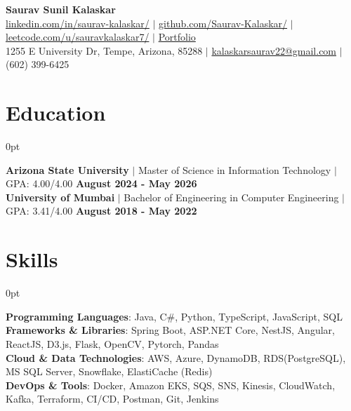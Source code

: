 \documentclass[letterpaper,10pt]{article}
\newlength{\contentindent}
\newcommand{\sectioncontent}[1]{%
  \begin{adjustwidth}{\contentindent}{0pt}%
  #1%
  \end{adjustwidth}%
}
\begin{document}
\setlength{\parindent}{0pt}
\setlength{\parskip}{0pt}
\setlength{\rightskip}{0.25em}

\begin{center}
    {\Huge \textbf{Saurav Sunil Kalaskar}}\\[2pt]
    
    \href{http://www.linkedin.com/in/saurav-kalaskar}{linkedin.com/in/saurav-kalaskar/} $|$
    \href{https://github.com/Saurav-Kalaskar}{github.com/Saurav-Kalaskar/} $|$
    \href{https://leetcode.com/u/sauravkalaskar7/}{leetcode.com/u/sauravkalaskar7/} $|$
    \href{https://www.saurav-kalaskar.me/}{Portfolio}
    \\
    1255 E University Dr, Tempe, Arizona, 85288 $|$ \href{mailto:sauravkalaskar7@gmail.com}{kalaskarsaurav22@gmail.com} $|$ (602) 399-6425    
\end{center}

\section{Education}
\sectioncontent{
\textbf{Arizona State University} $|$ Master of Science in Information Technology $|$ GPA: 4.00/4.00 \hfill \textbf{August 2024 - May 2026}
\\[2pt]
\textbf{University of Mumbai} $|$ Bachelor of Engineering in Computer Engineering $|$ GPA: 3.41/4.00 \hfill \textbf{August 2018 - May 2022}
\\[2pt]
}

\section{Skills}
\sectioncontent{
\textbf{Programming Languages}: Java, C\#, Python, TypeScript, JavaScript, SQL\\
\textbf{Frameworks \& Libraries}: Spring Boot, ASP.NET Core, NestJS, Angular, ReactJS, D3.js, Flask, OpenCV, Pytorch, Pandas\\
\textbf{Cloud \& Data Technologies}: AWS, Azure, DynamoDB, RDS(PostgreSQL), MS SQL Server, Snowflake, ElastiCache (Redis)\\
\textbf{DevOps \& Tools}: Docker, Amazon EKS, SQS, SNS, Kinesis, CloudWatch, Kafka, Terraform, CI/CD, Postman, Git, Jenkins\\
}
\end{document}
